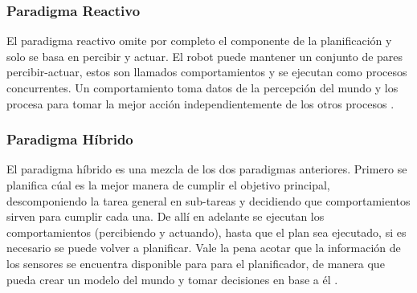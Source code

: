 \subsubsection{Paradigma Reactivo}
El paradigma reactivo omite por completo el componente de la planificación y solo se basa en percibir y actuar. El robot puede mantener un conjunto de pares percibir-actuar, estos son llamados comportamientos y se ejecutan como procesos concurrentes. Un comportamiento toma datos de la percepción del mundo y los procesa para tomar la mejor acción independientemente de los otros procesos \cite{AiRobotics}.

\subsubsection{Paradigma Híbrido}
El paradigma híbrido es una mezcla de los dos paradigmas anteriores. Primero se planifica cúal es la mejor manera de cumplir el objetivo principal, descomponiendo la tarea general en sub-tareas y decidiendo que comportamientos sirven para cumplir cada una. De allí en adelante se ejecutan los comportamientos (percibiendo y actuando), hasta que el plan sea ejecutado, si es necesario se puede volver a planificar. Vale la pena acotar que la información de los sensores se encuentra disponible para para el planificador, de manera que pueda crear un modelo del mundo y tomar decisiones en base a él  \cite{AiRobotics}. 
